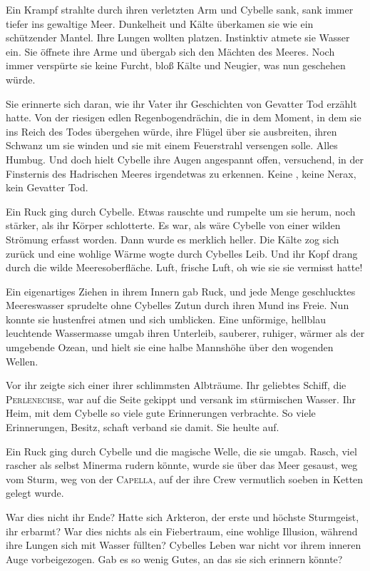 Ein Krampf strahlte durch ihren verletzten Arm und Cybelle sank, sank immer tiefer ins gewaltige Meer. Dunkelheit und Kälte überkamen sie wie ein schützender Mantel. Ihre Lungen wollten platzen. Instinktiv atmete sie Wasser ein. Sie öffnete ihre Arme und übergab sich den Mächten des Meeres. Noch immer verspürte sie keine Furcht, bloß Kälte und Neugier, was nun geschehen würde. 

Sie erinnerte sich daran, wie ihr Vater ihr Geschichten von Gevatter Tod erzählt hatte. Von der riesigen edlen Regenbogendrächin, die in dem Moment, in dem sie ins Reich des Todes übergehen würde, ihre Flügel über sie ausbreiten, ihren Schwanz um sie winden und sie mit einem Feuerstrahl versengen solle. Alles Humbug. Und doch hielt Cybelle ihre Augen angespannt offen, versuchend, in der Finsternis des Hadrischen Meeres irgendetwas zu erkennen. Keine , keine Nerax, kein Gevatter Tod.

Ein Ruck ging durch Cybelle. Etwas rauschte und rumpelte um sie herum, noch stärker, als ihr Körper schlotterte. Es war, als wäre Cybelle von einer wilden Strömung erfasst worden. Dann wurde es merklich heller. Die Kälte zog sich zurück und eine wohlige Wärme wogte durch Cybelles Leib. Und ihr Kopf drang durch die wilde Meeresoberfläche. Luft, frische Luft, oh wie sie sie vermisst hatte!

Ein eigenartiges Ziehen in ihrem Innern gab Ruck, und jede Menge geschlucktes Meereswasser sprudelte ohne Cybelles Zutun durch ihren Mund ins Freie. Nun konnte sie hustenfrei atmen und sich umblicken. Eine unförmige, hellblau leuchtende Wassermasse umgab ihren Unterleib, sauberer, ruhiger, wärmer als der umgebende Ozean, und hielt sie eine halbe Mannshöhe über den wogenden Wellen. 

Vor ihr zeigte sich einer ihrer schlimmsten Albträume. Ihr geliebtes Schiff, die \textsc{Perlenechse}, war auf die Seite gekippt und versank im stürmischen Wasser. Ihr Heim, mit dem Cybelle so viele gute Erinnerungen verbrachte. So viele Erinnerungen, Besitz, schaft verband sie damit. Sie heulte auf.

Ein Ruck ging durch Cybelle und die magische Welle, die sie umgab. Rasch, viel rascher als selbst Minerma rudern könnte, wurde sie über das Meer gesaust, weg vom Sturm, weg von der \textsc{Capella}, auf der ihre Crew vermutlich soeben in Ketten gelegt wurde.

War dies nicht ihr Ende? Hatte sich Arkteron, der erste und höchste Sturmgeist, ihr erbarmt? War dies nichts als ein Fiebertraum, eine wohlige Illusion, während ihre Lungen sich mit Wasser füllten? Cybelles Leben war nicht vor ihrem inneren Auge vorbeigezogen. Gab es so wenig Gutes, an das sie sich erinnern könnte?

